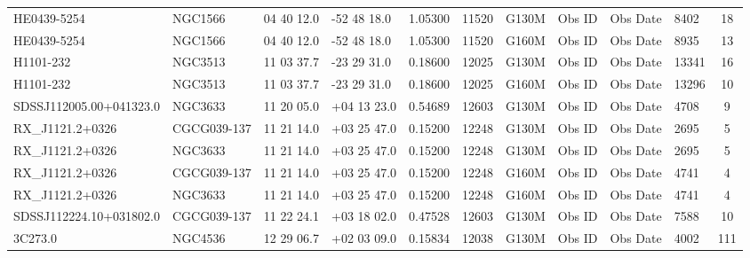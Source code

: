 \documentclass[iop]{emulateapj-rtx4}
\begin{document}
\begin{table}[ht]
\begin{center}
\begin{tabular}{l l l l l l l l l l c}
HE0439-5254  				&      NGC1566  		&      04  40  12.0  		&	-52  48  18.0  	&   1.05300  	& 11520		&   G130M	&   Obs ID  & Obs Date  & 8402  &       18         \\
HE0439-5254				&      NGC1566  		&      04  40  12.0  		&	-52  48  18.0  	&   1.05300  	& 11520		&   G160M	&   Obs ID  & Obs Date  & 8935  &       13         \\
H1101-232  				&      NGC3513  		&      11  03  37.7  		&	-23  29  31.0  	&   0.18600  	& 12025		&   G130M	&   Obs ID  & Obs Date  & 13341  &      16         \\
H1101-232  				&      NGC3513  		&      11  03  37.7  		&	-23  29  31.0  	&   0.18600  	& 12025		&   G160M	&   Obs ID  & Obs Date  & 13296  &      10         \\
SDSSJ112005.00+041323.0  	& 	NGC3633  		&      11  20  05.0  		&	+04  13  23.0 	&   0.54689  	& 12603		&   G130M	&   Obs ID  & Obs Date  & 4708  &       9            \\
RX\_J1121.2+0326  			&      CGCG039-137 		&   	11  21  14.0  		&	+03  25  47.0 	&   0.15200  	& 12248		&   G130M	&   Obs ID  & Obs Date  & 2695  &       5           \\
RX\_J1121.2+0326  			&      NGC3633  		&	11  21  14.0  		&	+03  25  47.0 	&   0.15200  	& 12248		&   G130M	&   Obs ID  & Obs Date  & 2695  &       5          \\
RX\_J1121.2+0326  			&      CGCG039-137 		&	11  21  14.0  		&	+03  25  47.0 	&   0.15200  	& 12248		&   G160M	&   Obs ID  & Obs Date  & 4741  &       4           \\
RX\_J1121.2+0326  			&      NGC3633  		&      11  21  14.0  		&	+03  25  47.0 	&   0.15200  	& 12248		&   G160M	&   Obs ID  & Obs Date  & 4741  &       4           \\
SDSSJ112224.10+031802.0  	& 	CGCG039-137 		&  	11  22  24.1  		&	+03  18  02.0 	&   0.47528  	& 12603		&   G130M	&   Obs ID  & Obs Date  & 7588  &       10          \\
3C273.0  					&	NGC4536  		&      12  29  06.7  		&	+02  03  09.0 	&   0.15834  	& 12038		&   G130M	&   Obs ID  & Obs Date  & 4002  &       111         \\

\end{tabular}
\end{center}
\end{table}
\end{document}
